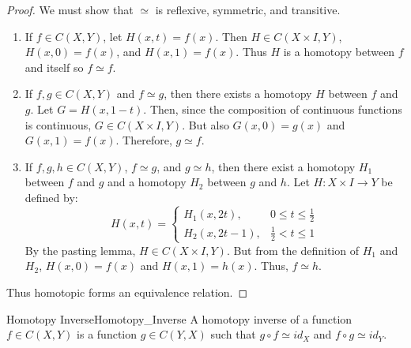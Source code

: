 \documentclass[crop=false,class=book,oneside]{standalone}                      %
\begin{document}
            \begin{proof}
                We must show that $\simeq$ is reflexive, symmetric, and
                transitive.
                \begin{enumerate}
                    \item If ${f}\in{C(X,Y)}$, let $H(x,t)=f(x)$. Then
                          $H\in{C({X}\times{I},Y)}$, $H(x,0)=f(x)$,
                          and $H(x,1)=f(x)$. Thus $H$ is a homotopy between
                          $f$ and itself so $f\simeq f$.
                    \item If ${f,g}\in{C(X,Y)}$ and ${f}\simeq{g}$, then there
                          exists a homotopy $H$ between $f$ and $g$. Let
                          $G=H(x,1-t)$. Then, since the composition of
                          continuous functions is continuous,
                          $G\in{C({X}\times{I},Y)}$. But also $G(x,0)=g(x)$ and
                          $G(x,1)=f(x)$. Therefore, ${g}\simeq{f}$.
                    \item If ${f,g,h}\in{C(X,Y)}$, ${f}\simeq{g}$, and
                          ${g}\simeq{h}$, then there exist a homotopy $H_{1}$
                          between $f$ and $g$ and a homotopy $H_{2}$ between
                          $g$ and $h$. Let $H:{X}\times{I}\rightarrow{Y}$
                          be defined by:
                          \begin{equation}
                              H(x,t)=
                              \begin{cases}
                                  H_{1}(x,2t),&{0}\leq{t}\leq\frac{1}{2}\\
                                  H_{2}(x,2t-1),&\frac{1}{2}<{t}\leq{1}
                              \end{cases}
                          \end{equation}
                          By the pasting lemma, $H\in{C({X}\times{I},Y)}$.
                          But from the definition of $H_{1}$ and $H_{2}$,
                          $H(x,0)=f(x)$ and $H(x,1)=h(x)$. Thus, $f\simeq{h}$.
                \end{enumerate}
                Thus homotopic forms an equivalence relation.
            \end{proof}
            \begin{ldefinition}{Homotopy Inverse}{Homotopy_Inverse}
                A homotopy inverse of a function $f\in{C}(X,Y)$ is a function
                $g\in{C}(Y,X)$ such that $g\circ{f}\simeq{id}_{X}$ and
                $f\circ{g}\simeq{id}_{Y}$.
            \end{ldefinition}
\end{document}
